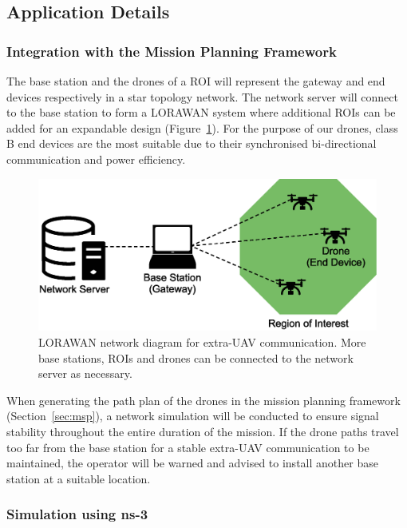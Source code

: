 \subsection{Application Details}
\label{sec:euc_application}

\subsubsection{Integration with the Mission Planning Framework}

The base station and the drones of a \gls{ROI} will represent the gateway and end devices respectively in a star topology network. The network server will connect to the base station to form a \gls{LORAWAN} system where additional \gls{ROI}s can be added for an expandable design (Figure~\ref{fig:euc_network_diagram}). For the purpose of our drones, class B end devices are the most suitable due to their synchronised bi-directional communication and power efficiency. 

\begin{figure}[h!]
    \centering
    \includegraphics[width=0.7\linewidth]{figs/Jihwan/Network Diagram of LoRa.eps}
    \caption[LoRaWAN Network Diagram for Extra-UAV Communication]
    {\gls{LORAWAN} network diagram for extra-\gls{UAV} communication. More base stations, \gls{ROI}s and drones can be connected to the network server as necessary.}
    \label{fig:euc_network_diagram}
\end{figure}

When generating the path plan of the drones in the mission planning framework (Section~\ref{sec:msp}), a network simulation will be conducted to ensure signal stability throughout the entire duration of the mission. If the drone paths travel too far from the base station for a stable extra-\gls{UAV} communication to be maintained, the operator will be warned and advised to install another base station at a suitable location. 
 
\subsubsection{Simulation using ns-3}

